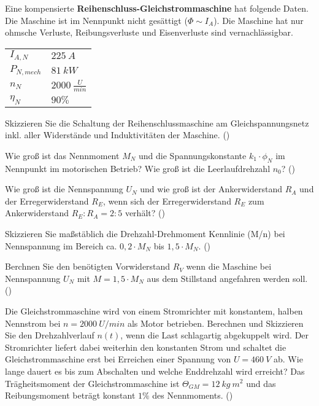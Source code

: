 \begin{question}[section=2,name={20.07.2016},mode=exm,type=bsp,tags={20160720}]
Eine kompensierte \textbf{Reihenschluss-Gleichstrommaschine} hat folgende Daten. Die Maschine ist im Nennpunkt nicht gesättigt ($\Phi \sim I_A$). Die Maschine hat nur ohmsche Verluste, Reibungsverluste und Eisenverluste sind vernachlässigbar.
\begin{tabular}{L{2cm}l}
$I_{A,N}$ \dotfill &$225~A$\\
$P_{N,mech}$ \dotfill & $81~kW$ \\
$n_N$ \dotfill & $2000~\frac{U}{min}$\\
$\eta_N$ \dotfill & $90\%$
\end{tabular}
\begin{compactenum}
\item Skizzieren Sie die Schaltung der Reihenschlussmaschine am Gleichspannungsnetz inkl. aller Widerstände und Induktivitäten der Maschine. ()
\item Wie groß ist das Nennmoment $M_N$ und die Spannungskonstante $k_1 \cdot \phi_N$ im Nennpunkt im motorischen Betrieb? Wie groß ist die Leerlaufdrehzahl $n_0$? ()
\item Wie groß ist die Nennspannung $U_N$ und wie groß ist der Ankerwiderstand $R_A$ und der Erregerwiderstand $R_E$, wenn sich der Erregerwiderstand $R_E$ zum Ankerwiderstand $R_E:R_A=2:5$ verhält? ()
\item Skizzieren Sie ma\ss stäblich die Drehzahl-Drehmoment Kennlinie (M/n) bei Nennspannung im Bereich ca. $0,2 \cdot M_N$ bis $1,5 \cdot M_N$. ()
\item Berchnen Sie den benötigten Vorwiderstand $R_V$ wenn die Maschine bei Nennspannung $U_N$ mit $M=1,5 \cdot M_N$ aus dem Stillstand angefahren werden soll. ()
\item Die Gleichstrommaschine wird von einem Stromrichter mit konstantem, halben Nennstrom bei $n = 2000 ~U/min$ als Motor betrieben. Berechnen und Skizzieren Sie den Drehzahlverlauf $n(t)$, wenn die Last schlagartig abgekuppelt wird. Der Stromrichter liefert dabei weiterhin den konstanten Strom und schaltet die Gleichstrommaschine erst bei Erreichen einer Spannung von $U= 460~V$ ab. Wie lange dauert es bis zum Abschalten und welche Enddrehzahl wird erreicht? Das Trägheitsmoment der Gleichstrommaschine ist $\Theta_{GM} = 12 ~kg~m^2$ und das Reibungsmoment beträgt konstant $1\%$ des Nennmoments. ()
\end{compactenum}
\end{question}
